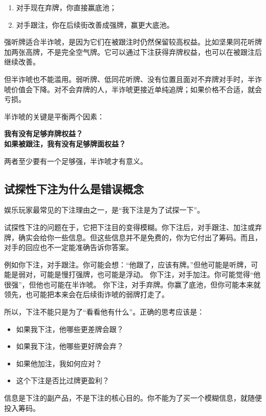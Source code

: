\begin{enumerate}
\item 对手现在弃牌，你直接赢底池；
\item 对手跟注，你在后续街改善成强牌，赢更大底池。
\end{enumerate}

强听牌适合半诈唬，是因为它们在被跟注时仍然保留较高权益。比如坚果同花听牌加两张高牌，不是完全空气牌。它可以通过下注获得弃牌权益，也可以在被跟注后继续改善。

但半诈唬也不能滥用。弱听牌、低同花听牌、没有位置且面对不弃牌对手时，半诈唬价值会下降。对不会弃牌的人，半诈唬更接近单纯追牌；如果价格不合适，就会亏损。

半诈唬的关键是平衡两个因素：

\begin{center}
\textbf{我有没有足够弃牌权益？\\
如果被跟注，我有没有足够牌面权益？}
\end{center}

两者至少要有一个足够强，半诈唬才有意义。

\subsection{试探性下注为什么是错误概念}

娱乐玩家最常见的下注理由之一，是“我下注是为了试探一下”。

试探性下注的问题在于，它把下注目的变得模糊。你下注后，对手跟注、加注或弃牌，确实会给你一些信息。但这些信息并不是免费的，你为它付出了筹码。而且，对手的回应也不一定能准确告诉你答案。

例如你下注，对手跟注。你可能会想：“他跟了，应该有牌。”但他可能是听牌，可能是弱对，可能是慢打强牌，也可能是浮动。
你下注，对手加注。你可能觉得“他很强”，但他也可能在半诈唬。
你下注，对手弃牌。你赢了底池，但你可能本来就领先，也可能把本来会在后续街诈唬的弱牌打走了。

所以，下注不能只是为了“看看他有什么”。正确的思考应该是：

\begin{itemize}
\item 如果我下注，他哪些更差牌会跟？
\item 如果我下注，他哪些更好牌会弃？
\item 如果他加注，我如何应对？
\item 这个下注是否比过牌更盈利？
\end{itemize}

信息是下注的副产品，不是下注的核心目的。你不能为了买一个模糊信息，就随便投入筹码。

